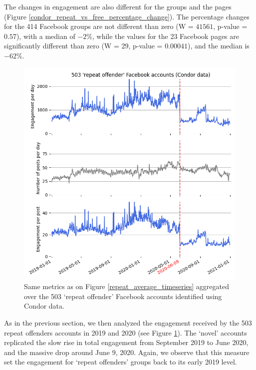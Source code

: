 \documentclass[review]{elsarticle}
\begin{document}
The changes in engagement are also different for the groups and the pages (Figure \ref{condor_repeat_vs_free_percentage_change}). 
The percentage changes for the 414 Facebook groups are not different than zero (W = $41561$, p-value = $0.57$), with a median of $-2\%$, while the values for the 23 Facebook pages are significantly different than zero (W = $29$, p-value = $0.00041$), and the median is $-62\%$.

\begin{figure}[!h]
\centering
\includegraphics[scale=0.5]{./../figure/condor_average_timeseries.png}
\caption{
Same metrics as on Figure \ref{repeat_average_timeseries} aggregated over the 503 `repeat offender' Facebook accounts identified using Condor data.
}
\label{condor_average_timeseries}
\end{figure}

As in the previous section, we then analyzed the engagement received by the 503 repeat offenders accounts in 2019 and 2020 (see Figure \ref{condor_average_timeseries}). 
The `novel' accounts replicated the slow rise in total engagement from September 2019 to June 2020, and the massive drop around June 9, 2020.
Again, we observe that this measure set the engagement for ‘repeat offenders’ groups back to its early 2019 level.
\end{document}
